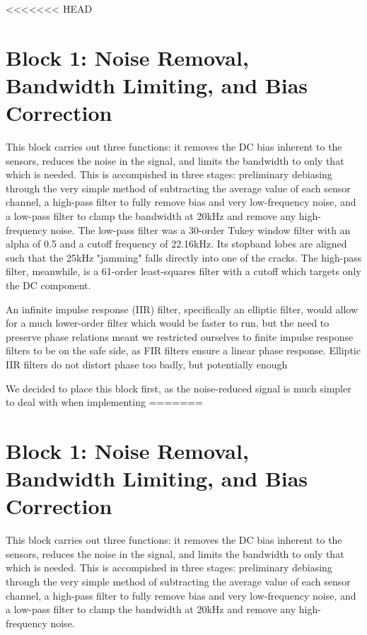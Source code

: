 <<<<<<< HEAD

\section{Block 1: Noise Removal, Bandwidth Limiting, and Bias Correction}

This block carries out three functions: it removes the DC bias inherent to the sensors, reduces the noise
 in the signal, and limits the bandwidth to only that which is needed. This is accompished in three stages:
 preliminary debiasing through the very simple method of subtracting the average value of each sensor channel,
 a high-pass filter to fully remove bias and very low-frequency noise, and a low-pass filter to clamp the
 bandwidth at 20kHz and remove any high-frequency noise. The low-pass filter was a 30-order Tukey window filter
 with an alpha of 0.5 and a cutoff frequency of 22.16kHz. Its stopband lobes are aligned such that the 25kHz
 "jamming" falls directly into one of the cracks.  The high-pass filter, meanwhile, is a 61-order least-squares
 filter with a cutoff which targets only the DC component.

An infinite impulse response (IIR) filter, specifically an elliptic filter, would allow for a much lower-order
 filter which would be faster to run, but the need to preserve phase relations meant we restricted ourselves to
 finite impulse response filters to be on the safe side, as FIR filters ensure a linear phase response. Elliptic
 IIR filters do not distort phase too badly, but potentially enough

We decided to place this block first, as the noise-reduced signal is much simpler to deal with when implementing
=======

\section{Block 1: Noise Removal, Bandwidth Limiting, and Bias Correction}

This block carries out three functions: it removes the DC bias inherent to the sensors, reduces the noise
 in the signal, and limits the bandwidth to only that which is needed. This is accompished in three stages:
 preliminary debiasing through the very simple method of subtracting the average value of each sensor channel,
 a high-pass filter to fully remove bias and very low-frequency noise, and a low-pass filter to clamp the
 bandwidth at 20kHz and remove any high-frequency noise. 

